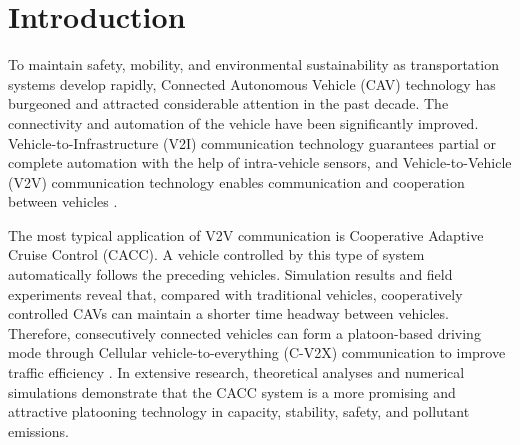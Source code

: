 \documentclass[trsc,nonblindrev]{informs3} %
\begin{document}
\section{Introduction}
\label{Section 1}
% 
% 
% 
% 
To maintain safety, mobility, and environmental sustainability as transportation systems develop rapidly, Connected Autonomous Vehicle (CAV) technology has burgeoned and attracted considerable attention in the past decade. The connectivity and automation of the vehicle have been significantly improved. Vehicle-to-Infrastructure (V2I) communication technology guarantees partial or complete automation with the help of intra-vehicle sensors, and Vehicle-to-Vehicle (V2V) communication technology enables communication and cooperation between vehicles \citep{wang2019survey,ploeg2011design,zhou2021impact}.

The most typical application of V2V communication is Cooperative Adaptive Cruise Control (CACC). A vehicle controlled by this type of system automatically follows the preceding vehicles. Simulation results and field experiments reveal that, compared with traditional vehicles, cooperatively controlled CAVs can maintain a shorter time headway between vehicles. Therefore, consecutively connected vehicles can form a platoon-based driving mode through Cellular vehicle-to-everything (C-V2X) communication to improve traffic efficiency \citep{VerizonNorth2020,gong2018cooperative,wang2020cooperative}. In extensive research, theoretical analyses and numerical simulations demonstrate that the CACC system is a more promising and attractive platooning technology in capacity, stability, safety, and pollutant emissions.
\end{document}
